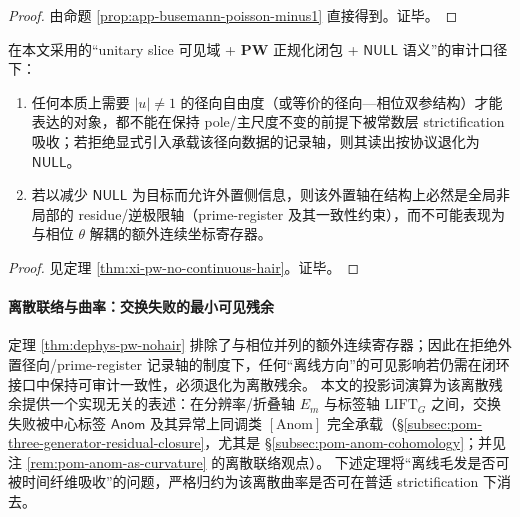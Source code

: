 \begin{proof}
由命题 \ref{prop:app-busemann-poisson-minus1} 直接得到。证毕。
\end{proof}

\begin{theorem}\label{thm:dephys-pw-nohair}
在本文采用的“unitary slice 可见域 + \(\mathbf{PW}\) 正规化闭包 + \(\mathsf{NULL}\) 语义”的审计口径下：
\begin{enumerate}
  \item 任何本质上需要 \(|u|\neq 1\) 的径向自由度（或等价的径向—相位双参结构）才能表达的对象，都不能在保持 pole/主尺度不变的前提下被常数层 strictification 吸收；若拒绝显式引入承载该径向数据的记录轴，则其读出按协议退化为 \(\mathsf{NULL}\)。
  \item 若以减少 \(\mathsf{NULL}\) 为目标而允许外置侧信息，则该外置轴在结构上必然是全局非局部的 residue/逆极限轴（prime-register 及其一致性约束），而不可能表现为与相位 \(\theta\) 解耦的额外连续坐标寄存器。
\end{enumerate}
\end{theorem}

\begin{proof}
见定理 \ref{thm:xi-pw-no-continuous-hair}。证毕。
\end{proof}

\paragraph{离散联络与曲率：交换失败的最小可见残余}
定理 \ref{thm:dephys-pw-nohair} 排除了与相位并列的额外连续寄存器；因此在拒绝外置径向/prime-register 记录轴的制度下，任何“离线方向”的可见影响若仍需在闭环接口中保持可审计一致性，必须退化为离散残余。
本文的投影词演算为该离散残余提供一个实现无关的表述：在分辨率/折叠轴 \(E_m\) 与标签轴 \(\mathrm{LIFT}_G\) 之间，交换失败被中心标签 \(\mathsf{Anom}\) 及其异常上同调类 \([\mathrm{Anom}]\) 完全承载（\S\ref{subsec:pom-three-generator-residual-closure}，尤其是 \S\ref{subsec:pom-anom-cohomology}；并见注 \ref{rem:pom-anom-as-curvature} 的离散联络观点）。
下述定理将“离线毛发是否可被时间纤维吸收”的问题，严格归约为该离散曲率是否可在普适 strictification 下消去。

